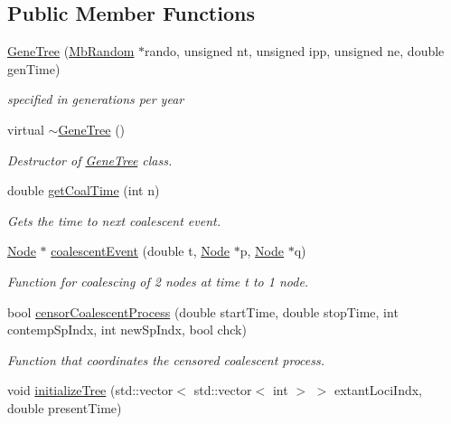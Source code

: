 \subsection*{Public Member Functions}
\begin{DoxyCompactItemize}
\item 
\mbox{\hyperlink{class_gene_tree_a57636d1228af2bca9cc76f61eeacf133}{Gene\+Tree}} (\mbox{\hyperlink{class_mb_random}{Mb\+Random}} $\ast$rando, unsigned nt, unsigned ipp, unsigned ne, double gen\+Time)
\begin{DoxyCompactList}\small\item\em specified in generations per year \end{DoxyCompactList}\item 
virtual \mbox{\hyperlink{class_gene_tree_a3194730e7bf9234b64596b33ea80b206}{$\sim$\+Gene\+Tree}} ()
\begin{DoxyCompactList}\small\item\em Destructor of \mbox{\hyperlink{class_gene_tree}{Gene\+Tree}} class. \end{DoxyCompactList}\item 
double \mbox{\hyperlink{class_gene_tree_aa82ff207791d4fa7c10c60148fa0e0c7}{get\+Coal\+Time}} (int n)
\begin{DoxyCompactList}\small\item\em Gets the time to next coalescent event. \end{DoxyCompactList}\item 
\mbox{\hyperlink{class_node}{Node}} $\ast$ \mbox{\hyperlink{class_gene_tree_a42733fabd2023bb63ba2e329277d4203}{coalescent\+Event}} (double t, \mbox{\hyperlink{class_node}{Node}} $\ast$p, \mbox{\hyperlink{class_node}{Node}} $\ast$q)
\begin{DoxyCompactList}\small\item\em Function for coalescing of 2 nodes at time t to 1 node. \end{DoxyCompactList}\item 
bool \mbox{\hyperlink{class_gene_tree_abc2bdf64c9b4e30a6a76d0b53543bdcf}{censor\+Coalescent\+Process}} (double start\+Time, double stop\+Time, int contemp\+Sp\+Indx, int new\+Sp\+Indx, bool chck)
\begin{DoxyCompactList}\small\item\em Function that coordinates the censored coalescent process. \end{DoxyCompactList}\item 
void \mbox{\hyperlink{class_gene_tree_a0a8c2983745b2e99585b467ab7bf1115}{initialize\+Tree}} (std\+::vector$<$ std\+::vector$<$ int $>$ $>$ extant\+Loci\+Indx, double present\+Time)

\end{DoxyCompactItemize}
